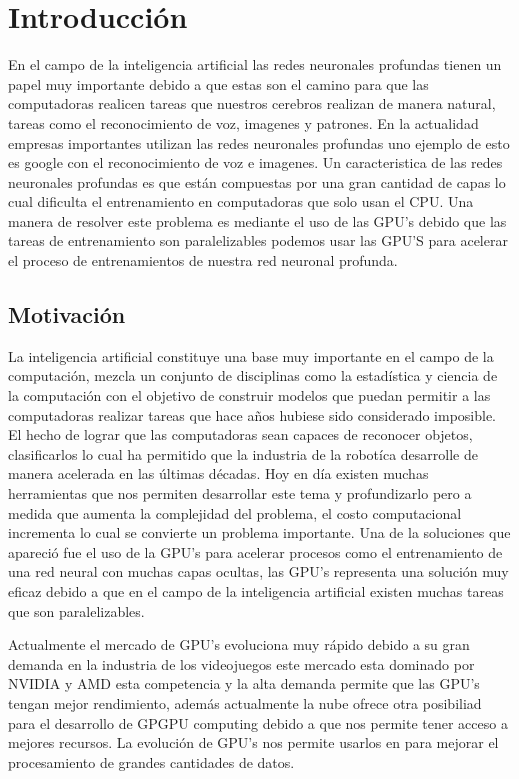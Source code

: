 \chapter{Introducción}
En el campo de la inteligencia artificial las redes neuronales profundas tienen un papel muy importante debido a que estas son el camino para que las computadoras realicen tareas que nuestros cerebros realizan de manera natural, tareas como el reconocimiento de voz, imagenes y patrones. En la actualidad empresas importantes utilizan las redes neuronales profundas uno ejemplo de esto es google con el reconocimiento de voz e imagenes. Un caracteristica de las redes neuronales profundas es que están compuestas por una gran cantidad de capas lo cual dificulta el entrenamiento en computadoras que solo usan el CPU. Una manera de resolver este problema es mediante el uso de las GPU's debido que las tareas de entrenamiento son paralelizables podemos usar las GPU'S para acelerar el proceso de entrenamientos de nuestra red neuronal profunda.

\section{Motivación}
La inteligencia artificial constituye una base muy importante en el campo de la computación, mezcla un conjunto de disciplinas como la estadística y ciencia de la computación con el objetivo de construir modelos que puedan permitir a las computadoras realizar tareas que hace años hubiese sido considerado imposible. El hecho de lograr que las computadoras sean capaces de reconocer objetos, clasificarlos lo cual ha permitido que la industria de la robotíca desarrolle de manera acelerada en las últimas décadas.  Hoy en día existen muchas herramientas que nos permiten desarrollar este tema y profundizarlo pero a medida que aumenta la complejidad del problema, el costo computacional incrementa lo cual se convierte un problema importante. Una de la soluciones que apareció fue el uso de la GPU's para acelerar procesos como el entrenamiento de una red neural con muchas capas ocultas, las GPU's representa una solución muy eficaz debido a que en el campo de la inteligencia artificial existen muchas tareas que son paralelizables.

 Actualmente el mercado de GPU's evoluciona muy rápido debido a su gran demanda en la industria de los videojuegos este mercado esta dominado por NVIDIA y AMD esta competencia y la alta demanda permite que las GPU's tengan mejor rendimiento, además actualmente la nube ofrece otra posibiliad para el desarrollo de GPGPU computing debido a que nos permite tener acceso a mejores recursos. La evolución de GPU's nos permite usarlos en para mejorar el procesamiento de grandes cantidades de datos.  
 
